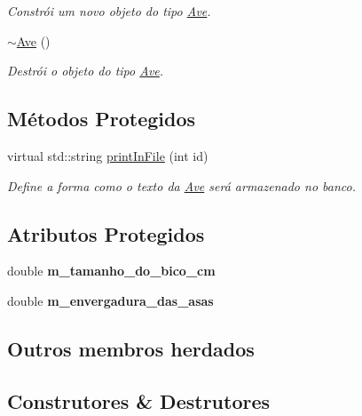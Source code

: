 \begin{DoxyCompactItemize}
\begin{DoxyCompactList}\small\item\em Constrói um novo objeto do tipo \hyperlink{classAve}{Ave}. \end{DoxyCompactList}\item 
\mbox{\label{classAve_ad290be8d6fb95f1cfd24b5f55def7741}} 
\hyperlink{classAve_ad290be8d6fb95f1cfd24b5f55def7741}{$\sim$\+Ave} ()
\begin{DoxyCompactList}\small\item\em Destrói o objeto do tipo \hyperlink{classAve}{Ave}. \end{DoxyCompactList}\end{DoxyCompactItemize}
\subsection*{Métodos Protegidos}
\begin{DoxyCompactItemize}
\item 
virtual std\+::string \hyperlink{classAve_a41d6ba4bf7e4823274211a9ae908ff1f}{print\+In\+File} (int id)
\begin{DoxyCompactList}\small\item\em Define a forma como o texto da \hyperlink{classAve}{Ave} será armazenado no banco. \end{DoxyCompactList}\end{DoxyCompactItemize}
\subsection*{Atributos Protegidos}
\begin{DoxyCompactItemize}
\item 
\mbox{\label{classAve_a6b226ae4077430877b040141105a9890}} 
double {\bfseries m\+\_\+tamanho\+\_\+do\+\_\+bico\+\_\+cm}
\item 
\mbox{\label{classAve_a6261373aae903e524e220e53ded18693}} 
double {\bfseries m\+\_\+envergadura\+\_\+das\+\_\+asas}
\end{DoxyCompactItemize}
\subsection*{Outros membros herdados}


\subsection{Construtores \& Destrutores}
\mbox{\label{classAve_aa1a19a4a964c41107df2886261f055e8}} 
